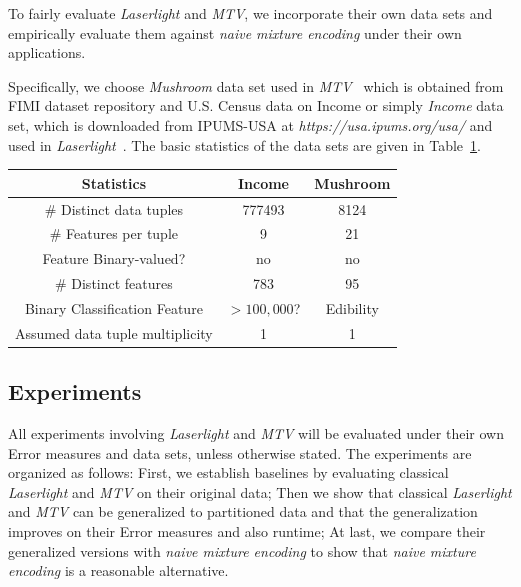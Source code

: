 To fairly evaluate \textit{Laserlight} and \textit{MTV}, we incorporate their own data sets and empirically evaluate them against \textit{naive mixture encoding} under their own applications.

Specifically, we choose \textit{Mushroom} data set used in \textit{MTV}~\cite{DBLP:journals/tkdd/MampaeyVT12} which is obtained from FIMI dataset repository and U.S. Census data on Income or simply \textit{Income} data set, which is downloaded from IPUMS-USA at \textit{https://usa.ipums.org/usa/} and used in \textit{Laserlight}~\cite{DBLP:journals/pvldb/GebalyAGKS14}.
The basic statistics of the data sets are given in Table~\ref{table:extendeddatasummary}.

\begin{table}[h!]
\centering
{}
\label{table:extendeddatasummary}
{\small \centering
\begin{tabular}{c c c}
\toprule
Statistics & Income & Mushroom \\
\midrule
\# Distinct data tuples & 777493 & 8124\\
\midrule
\# Features per tuple & 9 & 21\\
\midrule
Feature Binary-valued? & no& no\\
\midrule
\# Distinct features & 783 & 95\\
\midrule
Binary Classification Feature & $>100,000$? & Edibility\\
\midrule
Assumed data tuple multiplicity & 1 & 1\\
\bottomrule
\end{tabular}
}
\end{table}

\subsection{Experiments}
\label{sec:evaluatingalternativeapplicationsexperiments}
All experiments involving \textit{Laserlight} and \textit{MTV} will be evaluated under their own Error measures and data sets, unless otherwise stated.
The experiments are organized as follows: First, we establish baselines by evaluating classical \textit{Laserlight} and \textit{MTV} on their original data; Then we show that classical \textit{Laserlight} and \textit{MTV} can be generalized to partitioned data and that the generalization improves on their Error measures and also runtime; At last, we compare their generalized versions with \textit{naive mixture encoding} to show that \textit{naive mixture encoding} is a reasonable alternative.%

